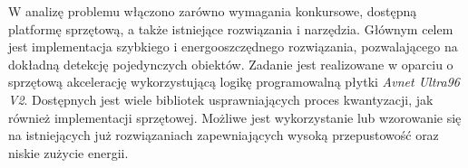 W analizę problemu włączono zarówno wymagania konkursowe, dostępną platformę sprzętową, a także istniejące rozwiązania i narzędzia.
Głównym celem jest implementacja szybkiego i energooszczędnego rozwiązania, pozwalającego na dokładną detekcję pojedynczych obiektów. 
Zadanie jest realizowane w oparciu o sprzętową akcelerację wykorzystującą logikę programowalną płytki \emph{Avnet Ultra96 V2}.
Dostępnych jest wiele bibliotek usprawniających proces kwantyzacji, jak również implementacji sprzętowej.
Możliwe jest wykorzystanie lub wzorowanie się na istniejących już rozwiązaniach zapewniających wysoką przepustowość oraz niskie zużycie energii. 





    

